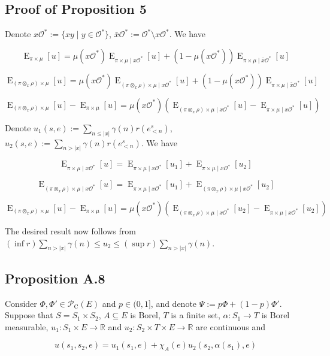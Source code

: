 \documentclass[a4paper]{article}
\DeclareMathOperator{\E}{E}
\newcommand{\Reals}{\mathbb{R}}
\newcommand{\Abs}[1]{\lvert #1 \rvert}
\newcommand{\Obs}{\mathcal{O}}
\newcommand{\CC}{\mathcal{P}_{\operatorname{C}}}
\begin{document}
\subsection{Proof of Proposition 5}

Denote ${x\Obs^*:=\{xy \mid y \in \Obs^*\}}$, $\bar{x}\Obs^*:=\Obs^* \setminus x\Obs^*$. We have

$$\E_{\pi \times \mu}[u] = \mu(x\Obs^*) \E_{\pi \times \mu \mid x \Obs^*}[u] + (1 - \mu(x\Obs^*)) \E_{\pi \times \mu \mid \bar{x} \Obs^*}[u]$$

$$\E_{(\pi \otimes_x \rho) \times \mu}[u] = \mu(x\Obs^*) \E_{(\pi \otimes_x \rho) \times \mu \mid x \Obs^*}[u] + (1 - \mu(x\Obs^*)) \E_{\pi \times \mu \mid \bar{x} \Obs^*}[u]$$

$$\E_{(\pi \otimes_x \rho) \times \mu}[u]-\E_{\pi \times \mu}[u] = \mu(x\Obs^*)(\E_{(\pi \otimes_x \rho) \times \mu \mid x \Obs^*}[u]-\E_{\pi \times \mu \mid x \Obs^*}[u])$$

Denote ${u_1(s,e):=\sum_{n \leq \Abs{x}} \gamma(n) r(e^s_{<n})}$, ${u_2(s,e):=\sum_{n > \Abs{x}} \gamma(n) r(e^s_{<n})}$. We have

$$\E_{\pi \times \mu \mid x \Obs^*}[u] = \E_{\pi \times \mu \mid x \Obs^*}[u_1] + \E_{\pi \times \mu \mid x \Obs^*}[u_2]$$

$$\E_{(\pi \otimes_x \rho) \times \mu \mid x \Obs^*}[u] = \E_{\pi \times \mu \mid x \Obs^*}[u_1] + \E_{(\pi \otimes_x \rho) \times \mu \mid x \Obs^*}[u_2]$$

$$\E_{(\pi \otimes_x \rho) \times \mu}[u]-\E_{\pi \times \mu}[u] = \mu(x\Obs^*)(\E_{(\pi \otimes_x \rho) \times \mu \mid x \Obs^*}[u_2]-\E_{\pi \times \mu \mid x \Obs^*}[u_2])$$

The desired result now follows from ${(\inf r) \sum_{n > \Abs{x}} \gamma(n) \leq u_2 \leq (\sup r) \sum_{n > \Abs{x}} \gamma(n)}$.

\subsection{Proposition A.8}

Consider ${\Phi, \Phi' \in \CC(E)}$ and ${p \in (0,1]}$, and denote ${\Psi:=p\Phi+(1-p)\Phi'}$. Suppose that ${S = S_1 \times S_2}$, ${A \subseteq E}$ is Borel, ${T}$ is a finite set, ${\alpha: S_1 \rightarrow T}$ is Borel measurable, ${u_1: S_1 \times E \rightarrow \Reals}$ and ${u_2: S_2 \times T \times E \rightarrow \Reals}$ are continuous and

$$u(s_1,s_2,e) = u_1(s_1,e) + \chi_A(e) u_2(s_2, \alpha(s_1), e)$$
\end{document}
